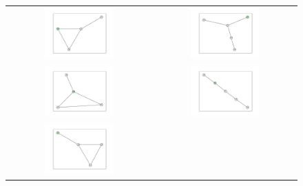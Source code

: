 \documentclass[12pt, a4paper]{extarticle}
\begin{document}
\begin{figure}\centering\begin{tabularx}{\textwidth}{cc}
\includegraphics[width=0.5\textwidth]{task11-graphlets/4_21-25-22-23.pdf} &
\includegraphics[width=0.5\textwidth]{task11-graphlets/5_10-14-21-20-23.pdf} \\
\includegraphics[width=0.5\textwidth]{task11-graphlets/4_21-18-25-23.pdf} &
\includegraphics[width=0.5\textwidth]{task11-graphlets/5_10-14-21-18-23.pdf} \\
\includegraphics[width=0.5\textwidth]{task11-graphlets/4_18-19-22-23.pdf} &

\end{tabularx}
\end{figure}
\end{document}
